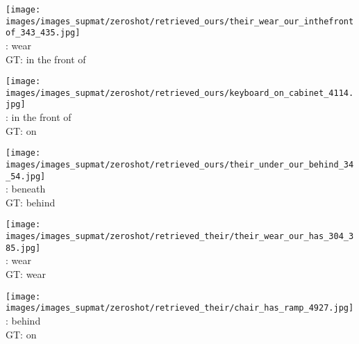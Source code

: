 \documentclass[10pt,twocolumn,letterpaper]{article}
\begin{document}
\begin{figure*}[t]
    \begin{minipage}[t]{0.185\textwidth}
    	\centering
       	\texttt{[image: images/images\_supmat/zeroshot/retrieved\_ours/their\_wear\_our\_inthefrontof\_343\_435.jpg]}\\
		\vspace{0.3ex}       	
       	\cite{Lu16}: wear \\
       	GT: in the front of
       	\vspace{3ex}
    \end{minipage}
    \hspace{0.005\textwidth}
    \begin{minipage}[t]{0.185\textwidth}
    	\centering
       	\texttt{[image: images/images\_supmat/zeroshot/retrieved\_ours/keyboard\_on\_cabinet\_4114.jpg]}\\
       	\vspace{0.3ex}
       	\cite{Lu16}: in the front of \\
       	GT: on
       	\vspace{0.2ex}
    \end{minipage}
    \hspace{0.005\textwidth}
    \begin{minipage}[t]{0.185\textwidth}
       \centering
       \texttt{[image: images/images\_supmat/zeroshot/retrieved\_ours/their\_under\_our\_behind\_34\_54.jpg]}\\
       \vspace{0.3ex}
       \cite{Lu16}: beneath \\
       GT: behind
       \vspace{0.2ex}
    \end{minipage}
    \hspace{0.005\textwidth}
    \begin{minipage}[t]{0.185\textwidth}
    	\centering
       	\texttt{[image: images/images\_supmat/zeroshot/retrieved\_their/their\_wear\_our\_has\_304\_385.jpg]}\\
       	\vspace{0.3ex}
       	\cite{Lu16}: wear \\
       	GT: wear
       	\vspace{0.2ex}
    \end{minipage}
    \hspace{0.005\textwidth}  
    \begin{minipage}[t]{0.185\textwidth}
    	\centering
       	\texttt{[image: images/images\_supmat/zeroshot/retrieved\_their/chair\_has\_ramp\_4927.jpg]}\\
       	\vspace{0.3ex}
       	\cite{Lu16}: behind \\
       	GT: on
      	\vspace{0.2ex}
    \end{minipage} 
    

\end{figure*}
\end{document}
